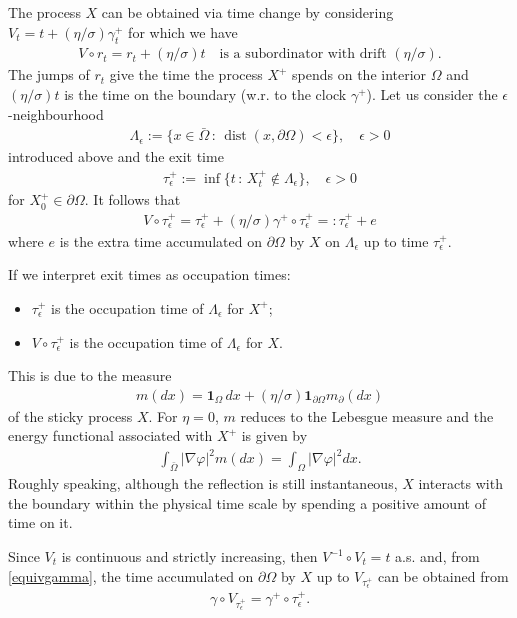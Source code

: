 \documentclass[11pt,a4paper]{article}
\newcommand{\magenta}{black}
\begin{document}
The process $X$ can be obtained via time change by considering $V_t = t + (\eta/\sigma) \gamma^+_t$ for which we have
\begin{align*}
V\circ r_t = r_t + (\eta/\sigma) t \quad \textrm{is a subordinator with drift $(\eta/\sigma)$}.
\end{align*}
The jumps of $r_t$ give the time the process $X^+$ spends on the interior $\Omega$ and $(\eta/\sigma) t$ is the time on the boundary (w.r. to the clock $\gamma^+$). Let us consider the $\epsilon$-neighbourhood 
\begin{align*}
\Lambda_\epsilon := \{x \in \bar{\Omega}\,:\, \operatorname{dist}(x, \partial \Omega) < \epsilon\}, \quad \epsilon>0
\end{align*}
introduced above and the exit time
\begin{align*}
\tau^+_\epsilon := \inf\{ t\,:\, X^+_t \notin \Lambda_\epsilon  \}, \quad \epsilon>0
\end{align*}
for $X^+_0 \in \partial \Omega$. It follows that      
\begin{align*}
V \circ \tau^+_\epsilon = \tau^+_\epsilon + (\eta/\sigma) \gamma^+ \circ \tau^+_\epsilon =: \tau^+_\epsilon + e
\end{align*}
where $e$ is the extra time accumulated on $\partial \Omega$ by $X$ on $\Lambda_\epsilon$ up to time $\tau^+_\epsilon$. {\color{\magenta} If we interpret exit times as occupation times:
\begin{itemize} \label{pageOcc12}
\item[O1)] $\tau^+_\epsilon$ is the occupation time of $\Lambda_\epsilon$ for $X^+$; 
\item[O2)] $V \circ \tau^+_\epsilon$ is the occupation time of $\Lambda_\epsilon$ for $X$.
\end{itemize}
This is due to the measure 
\begin{align*}
m(dx) = \mathbf{1}_\Omega\, dx + (\eta/\sigma) \mathbf{1}_{\partial \Omega} m_\partial(dx) 
\end{align*}
of the sticky process $X$. For $\eta =0$, $m$ reduces to the Lebesgue measure and the energy functional associated with $X^+$ is given by
\begin{align*}
\int_{\bar{\Omega}} |\nabla \varphi|^2 m(dx) = \int_\Omega |\nabla \varphi|^2 dx.
\end{align*}
Roughly speaking, although the reflection is still instantaneous, $X$ interacts with the boundary within the physical time scale by spending a positive amount of time on it. 

Since $V_t$ is continuous and strictly increasing, then $V^{-1} \circ V_t = t$ a.s. and, from \eqref{equivgamma}, the time accumulated on $\partial \Omega$ by $X$ up to $V_{\tau^+_\epsilon}$ can be obtained from 
\begin{align*}
\gamma \circ V_{\tau^+_\epsilon} = \gamma^+ \circ \tau^+_\epsilon.
\end{align*}}
\end{document}
